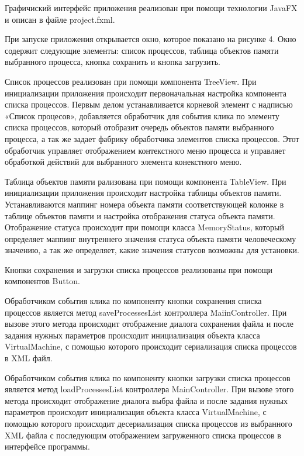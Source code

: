 \documentclass[russian,utf8,simple,hpadding=10mm,vpadding=20mm]{eskdtext}
\begin{document}
Графичиский интерфейс приложения реализован при помощи технологии JavaFX и описан в файле project.fxml.
 
При запуске приложения открывается окно, которое показано на рисунке 4. Окно содержит следующие элементы: список процессов, таблица объектов памяти выбранного процесса, кнопка сохранить и кнопка загрузить. 

Список процессов реализован при помощи компонента TreeView. При инициализации приложения происходит первоначальная настройка компонента списка процессов. Первым делом устанавливается корневой элемент с надписью «Список процесов», добавляется обработчик для события клика по элементу списка процессов, который отобразит очередь объектов памяти выбранного процесса, а так же задает фабрику обработчика элементов списка процессов. Этот обработчик управляет отображением контекстного меню процесса и управляет обработкой действий для выбранного элемента конекстного меню.

Таблица объектов памяти рализована при помощи компонента TableView. При инициализации приложения происходит настройка таблицы объектов памяти. Устанавливаются маппинг номера объекта памяти соответствующей колонке в таблице объектов памяти и настройка отображения статуса объекта памяти. Отображение статуса происходит при помощи класса MemoryStatus, который определяет маппинг внутреннего значения статуса объекта памяти человеческому значению, а так же определяет, какие значения статусов возможны для установки.

Кнопки сохранения и загрузки списка процессов реализованы при помощи компонентов Button.

Обработчиком события клика по компоненту кнопки сохранения списка процессов является метод saveProcessesList контроллера MaiinController. При вызове этого метода происходит отображение диалога сохранения файла и после задания нужных параметров происходит инициализация объекта класса VirtualMachine, с помощью которого происходит сериализация списка процессов в XML файл.

Обработчиком события клика по компоненту кнопки загрузки списка процессов является метод loadProcessesList контроллера MainController. При вызове этого метода происходит отображение диалога выбра файла и после задания нужных параметров происходит инициализация объекта класса VirtualMachine, с помощью которого происходит десериализация списка процессов из выбранного XML файла с последующим отображением загруженного списка процессов в интерфейсе программы.
 
\end{document}
